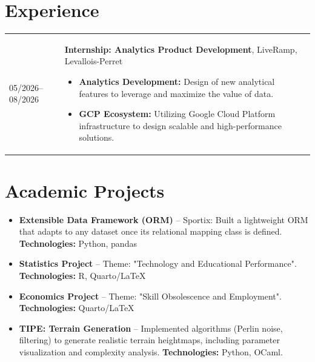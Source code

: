 \documentclass[11pt,a4paper]{article}
\begin{document}
\section*{Experience}

\begin{tabularx}{\textwidth}{@{}p{2.5cm} X@{}}
05/2026--08/2026 & \textbf{Internship: Analytics Product Development}, LiveRamp, Levallois-Perret
  \begin{itemize}[leftmargin=0.4cm, itemsep=1pt, topsep=0pt]
    \item \textbf{Analytics Development:} Design of new analytical features to leverage and maximize the value of data.
    \item \textbf{GCP Ecosystem:} Utilizing Google Cloud Platform infrastructure to design scalable and high-performance solutions.
  \end{itemize} \\
\end{tabularx}

\section*{Academic Projects}
\vspace{-0.1cm}
\begin{itemize}[leftmargin=0.4cm, itemsep=4pt]
    
    \item \textbf{Extensible Data Framework (ORM)} -- Sportix: Built a lightweight ORM that adapts to any dataset once its relational mapping class is defined.
    \textbf{Technologies:} Python, pandas
    \item \textbf{Statistics Project} -- Theme: "Technology and Educational Performance".
    \textbf{Technologies:} R, Quarto/\LaTeX
    \item \textbf{Economics Project} -- Theme: "Skill Obsolescence and Employment".
    \textbf{Technologies:} Quarto/\LaTeX
    \item \textbf{TIPE: Terrain Generation} -- Implemented algorithms (Perlin noise, filtering) to generate realistic terrain heightmaps, including parameter visualization and complexity analysis.
    \textbf{Technologies:} Python, OCaml.
\end{itemize}

\end{document}
